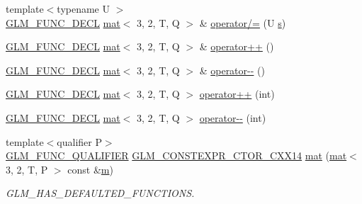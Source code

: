 \begin{DoxyCompactItemize}
\item 
{\footnotesize template$<$typename U $>$ }\\\mbox{\hyperlink{setup_8hpp_ab2d052de21a70539923e9bcbf6e83a51}{G\+L\+M\+\_\+\+F\+U\+N\+C\+\_\+\+D\+E\+CL}} \mbox{\hyperlink{structglm_1_1mat}{mat}}$<$ 3, 2, T, Q $>$ \& \mbox{\hyperlink{structglm_1_1mat_3_013_00_012_00_01_t_00_01_q_01_4_a366134387db31e4ae0b165945530d885}{operator/=}} (U \mbox{\hyperlink{_s_d_l__opengl_8h_a4af680a6c683f88ed67b76f207f2e6e4}{s}})
\item 
\mbox{\hyperlink{setup_8hpp_ab2d052de21a70539923e9bcbf6e83a51}{G\+L\+M\+\_\+\+F\+U\+N\+C\+\_\+\+D\+E\+CL}} \mbox{\hyperlink{structglm_1_1mat}{mat}}$<$ 3, 2, T, Q $>$ \& \mbox{\hyperlink{structglm_1_1mat_3_013_00_012_00_01_t_00_01_q_01_4_ad68d45e51b9606b49706ac69d2a68609}{operator++}} ()
\item 
\mbox{\hyperlink{setup_8hpp_ab2d052de21a70539923e9bcbf6e83a51}{G\+L\+M\+\_\+\+F\+U\+N\+C\+\_\+\+D\+E\+CL}} \mbox{\hyperlink{structglm_1_1mat}{mat}}$<$ 3, 2, T, Q $>$ \& \mbox{\hyperlink{structglm_1_1mat_3_013_00_012_00_01_t_00_01_q_01_4_a0968f00c3de947faa30c496ff103a0ec}{operator-\/-\/}} ()
\item 
\mbox{\hyperlink{setup_8hpp_ab2d052de21a70539923e9bcbf6e83a51}{G\+L\+M\+\_\+\+F\+U\+N\+C\+\_\+\+D\+E\+CL}} \mbox{\hyperlink{structglm_1_1mat}{mat}}$<$ 3, 2, T, Q $>$ \mbox{\hyperlink{structglm_1_1mat_3_013_00_012_00_01_t_00_01_q_01_4_ac1de03304a1fcb496a374a06854e3d7a}{operator++}} (int)
\item 
\mbox{\hyperlink{setup_8hpp_ab2d052de21a70539923e9bcbf6e83a51}{G\+L\+M\+\_\+\+F\+U\+N\+C\+\_\+\+D\+E\+CL}} \mbox{\hyperlink{structglm_1_1mat}{mat}}$<$ 3, 2, T, Q $>$ \mbox{\hyperlink{structglm_1_1mat_3_013_00_012_00_01_t_00_01_q_01_4_a1d64f18f5052894c3ce72e27ddd23a19}{operator-\/-\/}} (int)
\item 
{\footnotesize template$<$qualifier P$>$ }\\\mbox{\hyperlink{setup_8hpp_a33fdea6f91c5f834105f7415e2a64407}{G\+L\+M\+\_\+\+F\+U\+N\+C\+\_\+\+Q\+U\+A\+L\+I\+F\+I\+ER}} \mbox{\hyperlink{setup_8hpp_a0900f9145e68bf6061b6f5e7be3fa751}{G\+L\+M\+\_\+\+C\+O\+N\+S\+T\+E\+X\+P\+R\+\_\+\+C\+T\+O\+R\+\_\+\+C\+X\+X14}} \mbox{\hyperlink{structglm_1_1mat_3_013_00_012_00_01_t_00_01_q_01_4_a0d749576b4014d88c52fe8df4b559333}{mat}} (\mbox{\hyperlink{structglm_1_1mat}{mat}}$<$ 3, 2, T, P $>$ const \&\mbox{\hyperlink{_s_d_l__opengl__glext_8h_af593500c283bf1a787a6f947f503a5c2}{m}})
\begin{DoxyCompactList}\small\item\em G\+L\+M\+\_\+\+H\+A\+S\+\_\+\+D\+E\+F\+A\+U\+L\+T\+E\+D\+\_\+\+F\+U\+N\+C\+T\+I\+O\+NS. \end{DoxyCompactList}\item 

\end{DoxyCompactItemize}

